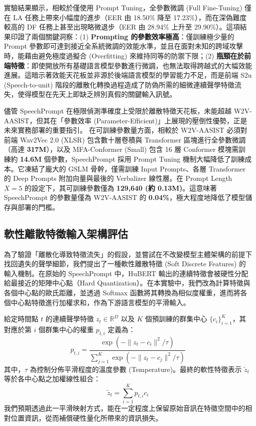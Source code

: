 實驗結果顯示，相較於僅使用 Prompt Tuning，全參數微調 (Full Fine-Tuning) 僅在 LA 任務上帶來小幅度的進步（EER 由 18.50\% 降至 17.23\%），而在深偽難度較高的 DF 任務上甚至出現略微退步（EER 由 28.94\% 上升至 29.90\%）。這項結果印證了兩個關鍵洞察：(1) \textbf{Prompting 的參數效率極高}：僅訓練極少量的 Prompt 參數即可達到接近全系統微調的效能水準，並且在面對未知的跨域攻擊時，能藉由避免極度過擬合 (Overfitting) 來維持同等的防禦下限；(2) \textbf{瓶頸在於前端特徵}：即使開放所有基礎語言模型參數進行微調，也無法取得跨越式的大幅效能進展。這暗示著效能天花板並非源於後端語言模型的學習能力不足，而是前端 S2u (Speech-to-unit) 階段的離散化轉換過程造成了防偽所需的細微連續聲學特徵流失，使得模型在先天上即缺乏辨別真假的關鍵輸入訊號。

儘管 SpeechPrompt 在極限偵測準確度上受限於離散特徵天花板，未能超越 W2V-AASIST，但其在「參數效率 (Parameter-Efficient)」上展現的壓倒性優勢，正是未來實務部署的重要指引。
在可訓練參數量方面，相較於 W2V-AASIST 必須對前端 Wav2Vec 2.0 (XLSR) 包含數十層卷積與 Transformer 區塊進行全參數微調（高達 \textbf{317M}），以及 MFA-Conformer (Small) 包含 16 層 Conformer 模塊需訓練約 \textbf{14.6M} 個參數，SpeechPrompt 採用 Prompt Tuning 機制大幅降低了訓練成本。它凍結了龐大的 GSLM 骨幹，僅需訓練 Input Prompts、各層 Transformer 的 Deep Prompts 附加向量與最後的 Verbalizer 線性層。在 Prompt Length $X=5$ 的設定下，其可訓練參數僅為 \textbf{129,640 (約 0.13M)}。這意味著 SpeechPrompt 的參數量僅為 W2V-AASIST 的 \textbf{0.04\%}，極大程度地降低了模型儲存與部署的門檻。

\subsection{軟性離散特徵輸入架構評估}
\label{subsec:soft_discrete}
為了驗證「離散化導致特徵流失」的假設，並嘗試在不改變模型主體架構的前提下找回遺失的聲學細節，我們提出了一種軟性離散特徵 (Soft Discrete Features) 的輸入機制。在原始的 SpeechPrompt 中，HuBERT 輸出的連續特徵會被硬性分配給最接近的矩陣中心點（Hard Quantization）。在本實驗中，我們改為計算特徵與各個中心點的歐氏距離，並透過 Softmax 函數將其轉換為相似度權重，進而將各個中心點特徵進行加權求和，作為下游語言模型的平滑輸入。

給定時間點 $t$ 的連續聲學特徵 $z_t \in \mathbb{R}^D$ 以及 $K$ 個預訓練的群集中心 $\{c_i\}_{i=1}^K$，其對應於第 $i$ 個群集中心的權重 $p_{t,i}$ 定義為：
\begin{equation}
    p_{t,i} = \frac{\exp(-\|z_t - c_i\|^2 / \tau)}{\sum_{j=1}^K \exp(-\|z_t - c_j\|^2 / \tau)}
\end{equation}
其中，$\tau$ 為控制分佈平滑程度的溫度參數 (Temperature)。最終的軟性特徵表示 $\tilde{z}_t$ 等於各中心點之加權線性組合：
\begin{equation}
    \tilde{z}_t = \sum_{i=1}^K p_{t,i} c_i
\end{equation}
我們預期透過此一平滑映射方式，能在一定程度上保留原始音訊在特徵空間中的相對位置資訊，從而補償硬性量化所帶來的資訊損失。

